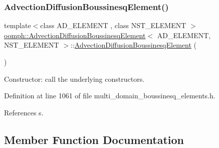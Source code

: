 \subsubsection{\texorpdfstring{Advection\+Diffusion\+Boussinesq\+Element()}{AdvectionDiffusionBoussinesqElement()}}
{\footnotesize\ttfamily template$<$class A\+D\+\_\+\+E\+L\+E\+M\+E\+NT , class N\+S\+T\+\_\+\+E\+L\+E\+M\+E\+NT $>$ \\
\hyperlink{classoomph_1_1AdvectionDiffusionBoussinesqElement}{oomph\+::\+Advection\+Diffusion\+Boussinesq\+Element}$<$ A\+D\+\_\+\+E\+L\+E\+M\+E\+NT, N\+S\+T\+\_\+\+E\+L\+E\+M\+E\+NT $>$\+::\hyperlink{classoomph_1_1AdvectionDiffusionBoussinesqElement}{Advection\+Diffusion\+Boussinesq\+Element} (\begin{DoxyParamCaption}{ }\end{DoxyParamCaption})\hspace{0.3cm}{\ttfamily [inline]}}



Constructor\+: call the underlying constructors. 



Definition at line 1061 of file multi\+\_\+domain\+\_\+boussinesq\+\_\+elements.\+h.



References s.



\subsection{Member Function Documentation}
\mbox{\label{classoomph_1_1AdvectionDiffusionBoussinesqElement_afc63db5ad4e397df7809447ee3ca56ac}} 
